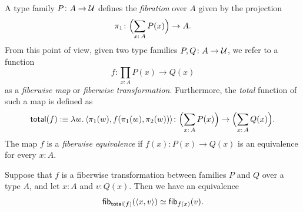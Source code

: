\begin{defn}\label{defn:total-map}
    A type family $P\colon A\to\univ$ defines the \textsl{fibration} over $A$ given by the projection
    \[
        \pi_1\colon\Bigl(\sum_{x\colon A}P(x)\Bigr)\to A.
    \]
    From this point of view, given two type families $P,Q\colon A\to\univ$, we refer to a function 
    \[
        f\colon\prod_{x\colon A}P(x)\to Q(x)
    \]
    as a \textsl{fiberwise map} or \textsl{fiberwise transformation}. Furthermore, the \textsl{total} function of such a map is defined as
    \[
        \fun{total}(f)\defeq
            \lambda w.\,
                \dep{
                    \pi_1(w),
                    f(\pi_1(w),\pi_2(w))
                }
                \colon
                    \Bigl(
                        \sum_{x\colon A}P(x)
                    \Bigr)\to
                    \Bigl(
                        \sum_{x\colon A}Q(x)
                    \Bigr).
    \]
    The map $f$ is a \textsl{fiberwise equivalence} if $f(x)\colon P(x)\to Q(x)$ is an equivalence for every $x\colon A$.
\end{defn}

\begin{thm}\label{thm:total-fib-equivalence}
    Suppose that\/ $f$ is a fiberwise transformation between families\/ $P$ and\/ $Q$ over a type\/ $A$, and let\/ $x\colon A$ and\/ $v\colon Q(x)$. Then we have an equivalence
    \[
        \mathsf{fib}_{\mathsf{total}(f)}(\langle x, v\rangle) \simeq \mathsf{fib}_{f(x)}(v).
    \]
\end{thm}

